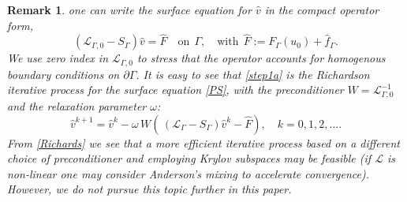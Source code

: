 \documentclass{article}
\newtheorem{remark}{Remark}[section]
\newcommand{\cL}{\mathcal L}
\def\dG{{\partial\Gamma} }
\begin{document}
\begin{remark}
one can write the surface equation for $\hat{v}$ in the compact operator form,
\begin{equation} \label{PS}
(\cL_{\Gamma,0}-S_\Gamma) \hat{v}= \hat{F}\quad \text{on}~~\Gamma,\quad\text{with}~~ \hat{F}:=F_\Gamma(u_0)+ \hat{f}_\Gamma.
\end{equation}
We use zero index in $\cL_{\Gamma,0}$ to stress that the operator accounts for homogenous boundary conditions on $\dG$. It is easy to see that \eqref{step1a} is the Richardson iterative process for the surface
equation \eqref{PS}, with the preconditioner $W=\cL_{\Gamma,0}^{-1}$ and the relaxation parameter $\omega$:
\begin{equation} \label{Richards}
\hat{v}^{k+1}=\hat{v}^{k}-\omega\,W\left(\, (\cL_\Gamma-S_\Gamma) \hat{v}^k-\hat{F}\right),\quad k=0,1,2,\dots.
\end{equation}
From \eqref{Richards} we see that a more efficient iterative process based on a different choice
of preconditioner and employing  Krylov subspaces may be feasible {(if $\cL$ is non-linear one may consider Anderson's mixing to accelerate convergence)}.  However, we do not pursue this topic further in this paper.
\end{remark}

\end{document}
